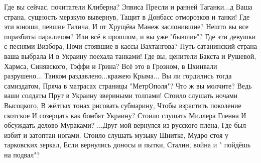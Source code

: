  
 
 
 
 



Где вы сейчас, почитатели Клиберна?
Элвиса Пресли и ранней Таганки...д
Ваша страна, сущность мерзкую вывернув,
Тащит в Донбасс отморозков и танки!
Где эти юноши, певшие Галича,
И от Хрущёва Манеж заслонившие?
Нешто вы все поразбиты параличом?
Или всё в прошлом, и вы уже "бывшие"?
Где эти девушки с песнями Визбора,
Ночи стоявшие в кассы Вахтангова?
Путь сатанинский страна ваша выбрала
И в Украину поехала танками!
Где вы, ценители Бакста и Рушевой,
Хармса, Синявского, Тэффи и Грина?
Всё это в Грозном, в Цхинвали разрушено...
Танком раздавлено...кражею Крыма...
Вы ли гордились тогда самиздатом,
Пряча в матрасах страницы "МетрОполя"?
Что ж вы молчите? Ведь ваши солдаты
Прут в Украину звериными толпами!
Стоило слушать ночами Высоцкого,
В жёлтых тонах рисовать субмарину,
Чтобы взрастить поколение скотское
И созерцать как бомбят Украину?
Стоило слушать Миллера Гленна
И обсуждать делово Мураками?
...Друг мой вернулся из русского плена,
Где был избит и затоптан ногами.
Стоило слушать музыку Шнитке,
Мудро стоя у тарковских зеркал,
Если вернулись доносы и пытки,
Сталин, война и " пойдёшь на подвал"?
